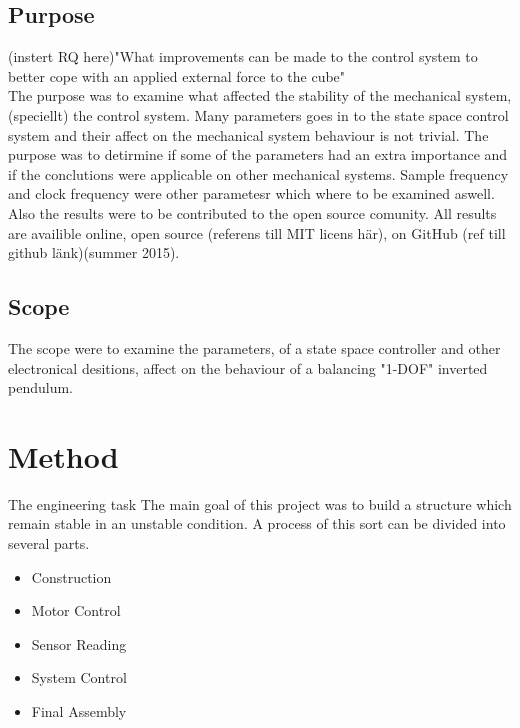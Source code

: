\documentclass[a4paper,11pt]{kth-mag}
\begin{document}
\section{Purpose}

(instert RQ here)"What improvements can be made to the control system to better cope with an applied external force to the cube"  \\

\noindent{}The purpose was to examine what affected the stability of the mechanical system, (speciellt) the control system. Many parameters goes in to the state space control system and their affect on the mechanical system behaviour is not trivial. The purpose was to detirmine if some of the parameters had an extra importance and if the conclutions were applicable on other mechanical systems. Sample frequency and clock frequency were other parametesr which where to be examined aswell. Also the results were to be contributed to the open source comunity. All results are availible online, open source (referens till MIT licens här), on GitHub (ref till github länk)(summer 2015).\\  


\section{Scope}
The scope were to examine the parameters, of a state space controller and other electronical desitions, affect on the behaviour of a balancing "1-DOF" inverted pendulum.


\chapter{Method}

The engineering task The main goal of this project was to build a structure which remain stable in an unstable condition. A process of this sort can be divided into several parts. 
\begin{itemize}
\item Construction
\item Motor Control
\item Sensor Reading
\item System Control
\item Final Assembly
\end{itemize}
\end{document}
